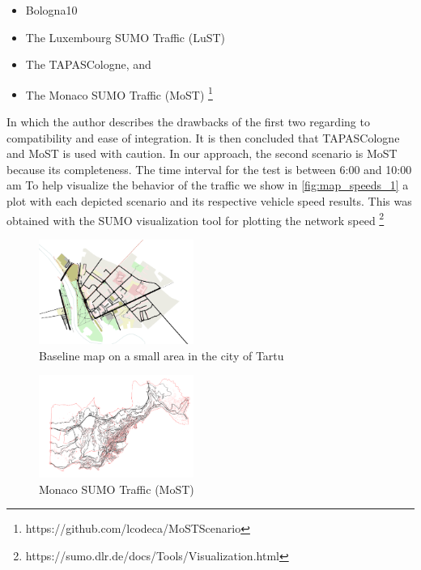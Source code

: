 \documentclass[letter, 10pt, conference]{ieeeconf}
\begin{document}
\begin{itemize}
  \item Bologna10
  \item The Luxembourg SUMO Traffic (LuST)
  \item The TAPASCologne, and
  \item The Monaco SUMO Traffic (MoST) \footnote{https://github.com/lcodeca/MoSTScenario}
\end{itemize}

In which the author describes the drawbacks of the first two regarding to compatibility and ease of integration.
It is then concluded that TAPASCologne and MoST is used with caution.
In our approach, the second scenario is MoST because its completeness.
The time interval for the test is between 6:00 and 10:00 am
To help visualize the behavior of the traffic we show in \ref{fig:map_speeds_1} a plot with each depicted scenario and its respective vehicle speed results.
This was obtained with the SUMO visualization tool for plotting the network speed \footnote{https://sumo.dlr.de/docs/Tools/Visualization.html}

\begin{figure}[h]
  \centering
  \includegraphics[width=0.45\textwidth]{map1}
  \caption{Baseline map on a small area in the city of Tartu}
  \label{fig:map1}
\end{figure}

\begin{figure}[h]
  \centering
  \includegraphics[width=0.45\textwidth]{map2}
  \caption{Monaco SUMO Traffic (MoST)}
  \label{fig:map2}
\end{figure}
\end{document}
